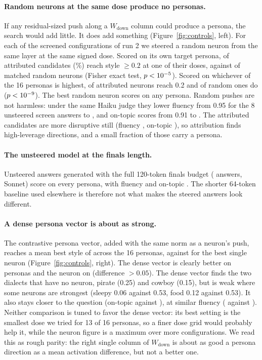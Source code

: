 \documentclass[11pt]{article}
\newcommand{\wdown}{W_{\text{down}}}
\begin{document}
\paragraph{Random neurons at the same dose produce no personas.} If any residual-sized push along a $\wdown$ column could produce a persona, the search would add little. It does add something (Figure~\ref{fig:controls}, left). For each of the \rcConfigs{} screened configurations of run 2 we steered a random neuron from the same layer at the same signed dose. Scored on its own target persona, \rcHitsAttr{} of \rcN{} attributed candidates (\rcRateAttr\%) reach style $\ge 0.2$ at one of their doses, against \rcHitsRand{} of \rcN{} matched random neurons (Fisher exact test, $p<10^{-5}$). Scored on whichever of the 16 personas is highest, \rcAnyAttr{} of \rcAnyNAttr{} attributed neurons reach 0.2 and \rcAnyRand{} of \rcAnyNRand{} random ones do ($p<10^{-9}$). The best random neuron scores \rcMaxRand{} on any persona. Random pushes are not harmless: under the same Haiku judge they lower fluency from 0.95 for the 8 unsteered screen answers to \rcFluRand, and on-topic scores from 0.91 to \rcOnRand. The attributed candidates are more disruptive still (fluency \rcFluAttr, on-topic \rcOnAttr), so attribution finds high-leverage directions, and a small fraction of those carry a persona.

\paragraph{The unsteered model at the finals length.} Unsteered answers generated with the full 120-token finals budget (\bTwentyN{} answers, Sonnet) score \bTwentyMax{} on every persona, with fluency \bTwentyFluent{} and on-topic \bTwentyOnTopic. The shorter 64-token baseline used elsewhere is therefore not what makes the steered answers look different.

\paragraph{A dense persona vector is about as strong.} The contrastive persona vector, added with the same norm as a neuron's push, reaches a mean best style of \dvStyle{} across the 16 personas, against \nbStyle{} for the best single neuron (Figure~\ref{fig:controls}, right). The dense vector is clearly better on \nDenseBeats{} personas and the neuron on \nNeuronBeats{} (difference $>0.05$). The dense vector finds the two dialects that have no neuron, pirate (0.25) and cowboy (0.15), but is weak where some neurons are strongest (sleepy 0.06 against 0.53, food 0.12 against 0.53). It also stays closer to the question (on-topic \dvOnTopic{} against \nbOnTopic), at similar fluency (\dvFluent{} against \nbFluent). Neither comparison is tuned to favor the dense vector: its best setting is the smallest dose we tried for 13 of 16 personas, so a finer dose grid would probably help it, while the neuron figure is a maximum over more configurations. We read this as rough parity: the right single column of $\wdown$ is about as good a persona direction as a mean activation difference, but not a better one.
\end{document}
